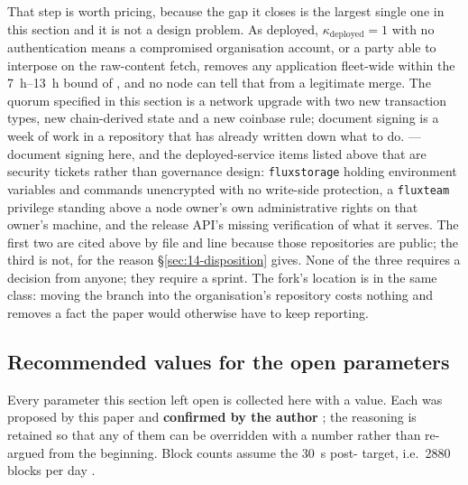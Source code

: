 That step is worth pricing, because the gap it closes is the largest single one in this section and
it is not a design problem. As deployed, $\kappa_{\mathrm{deployed}} = 1$ with no authentication
means a compromised organisation account, or a party able to interpose on the raw-content fetch,
removes any application fleet-wide within the \SIrange{7}{13}{\hour} bound of
, and no node can tell that from a legitimate merge. The quorum specified
in this section is a network upgrade with two new transaction types, new chain-derived state and a
new coinbase rule; document signing is a week of work in a repository that has already written down
what to do.   --- document signing here, and the deployed-service items
listed above that are security tickets rather than governance design: \texttt{fluxstorage} holding
environment variables and commands unencrypted with no write-side protection, a \texttt{fluxteam}
privilege standing above a node owner's own administrative rights on that owner's machine, and the
release API's missing verification of what it serves. The first two are cited above by file and line
because those repositories are public; the third is not, for the reason
\S\ref{sec:14-disposition} gives. None of the three requires a decision from anyone; they require a
sprint. The  fork's location is in the same class: moving the branch into the
organisation's repository costs nothing and removes a fact the paper would otherwise have to keep
reporting.

\subsection{Recommended values for the open parameters}
\label{sec:23:recommended}

Every parameter this section left open is collected here with a value. Each was proposed by this
paper and \textbf{confirmed by the author} ; the reasoning
is retained so that any of them can be overridden with a number rather than re-argued from the
beginning. Block counts assume the \SI{30}{\second}
post-\PoN{} target, i.e.\ \num{2880} blocks per day .

